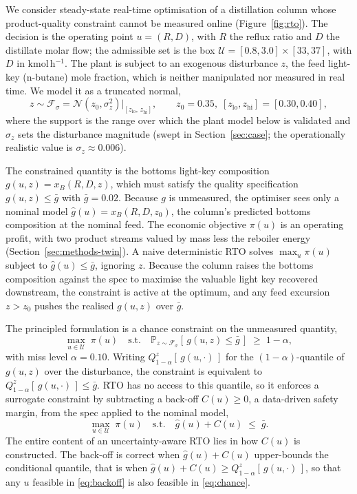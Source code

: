 \documentclass[review,times]{elsarticle}
\begin{document}
We consider steady-state real-time optimisation of a distillation column whose
product-quality constraint cannot be measured online (Figure~\ref{fig:rto}). The decision is
the operating point $u=(R,D)$, with $R$ the reflux ratio and $D$ the distillate molar flow;
the admissible set is the box $\mathcal{U}=[0.8,3.0]\times[33,37]$, with $D$ in
kmol\,h$^{-1}$. The plant is subject to an exogenous disturbance $z$, the feed light-key
(n-butane) mole fraction, which is neither manipulated nor measured in real time. We model
it as a truncated normal,
\begin{equation*}
z \sim \mathcal{F}_\sigma = \mathcal{N}\!\left(z_0,\sigma_z^2\right)\big|_{[z_{\mathrm{lo}},\,z_{\mathrm{hi}}]},
\qquad z_0=0.35,\;[z_{\mathrm{lo}},z_{\mathrm{hi}}]=[0.30,0.40],
\end{equation*}
where the support is the range over which the plant model below is validated and $\sigma_z$
sets the disturbance magnitude (swept in Section~\ref{sec:case}; the operationally realistic
value is $\sigma_z\approx 0.006$).

The constrained quantity is the bottoms light-key composition $g(u,z)=x_{B}(R,D,z)$, which
must satisfy the quality specification $g(u,z)\le\bar g$ with $\bar g = 0.02$. Because $g$ is
unmeasured, the optimiser sees only a nominal model $\hat g(u)=x_B(R,D,z_0)$, the column's
predicted bottoms composition at the nominal feed. The economic objective $\pi(u)$ is an
operating profit, with two product streams valued by mass less the reboiler energy
(Section~\ref{sec:methods-twin}). A naive deterministic RTO solves $\max_{u}\pi(u)$ subject
to $\hat g(u)\le\bar g$, ignoring $z$. Because the column raises the bottoms composition
against the spec to maximise the valuable light key recovered downstream, the constraint is
active at the optimum, and any feed excursion $z>z_0$ pushes the realised $g(u,z)$ over $\bar
g$.

The principled formulation is a chance constraint on the unmeasured quantity,
\begin{equation}
\max_{u\in\mathcal U}\; \pi(u)
\quad\text{s.t.}\quad
\mathbb{P}_{z\sim\mathcal F_\sigma}\!\left[\,g(u,z)\le \bar g\,\right]\;\ge\;1-\alpha,
\label{eq:chance}
\end{equation}
with miss level $\alpha=0.10$. Writing $Q^{z}_{1-\alpha}[\,g(u,\cdot)\,]$ for the
$(1-\alpha)$-quantile of $g(u,z)$ over the disturbance, the constraint is equivalent to
$Q^{z}_{1-\alpha}[\,g(u,\cdot)\,]\le\bar g$. RTO has no access to this quantile, so it
enforces a surrogate constraint by subtracting a back-off $C(u)\ge 0$, a data-driven safety
margin, from the spec applied to the nominal model,
\begin{equation}
\max_{u\in\mathcal U}\; \pi(u)
\quad\text{s.t.}\quad
\hat g(u) + C(u)\;\le\;\bar g .
\label{eq:backoff}
\end{equation}
The entire content of an uncertainty-aware RTO lies in how $C(u)$ is constructed. The
back-off is correct when $\hat g(u)+C(u)$ upper-bounds the conditional quantile, that is when
$\hat g(u)+C(u)\ge Q^{z}_{1-\alpha}[\,g(u,\cdot)\,]$, so that any $u$ feasible in
\eqref{eq:backoff} is also feasible in \eqref{eq:chance}.
\end{document}

